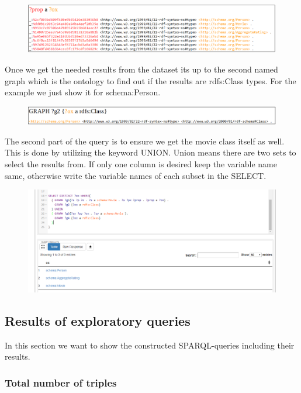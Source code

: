 \documentclass{article}
\begin{document}
\begin{figure}[H]
  \centering
  \includegraphics[width=12cm]{pictures/example_query4.png}
  \label{fig:exqu4}
\end{figure}
\noindent
Once we get the needed results from the dataset its up to the second named graph which is the ontology to find out if the results are rdfs:Class types. For the example we just show it for schema:Person.

\begin{figure}[H]
  \centering
  \includegraphics[width=12cm]{pictures/example_query5.png}
  \label{fig:exqu5}
\end{figure}
\noindent
The second part of the query is to ensure we get the movie class itself as well. This is done by utilizing the keyword UNION. Union means there are two sets to select the results from. If only one column is desired keep the variable name same, otherwise write the variable names of each subset in the SELECT.

\begin{figure}[H]
  \centering
  \includegraphics[width=12cm]{pictures/example_query_result.png}
  \label{fig:exqures}
\end{figure}
\newpage


\subsection{Results of exploratory queries}
In this section we want to show the constructed SPARQL-queries including their results.
\subsubsection{Total number of triples}
\end{document}
